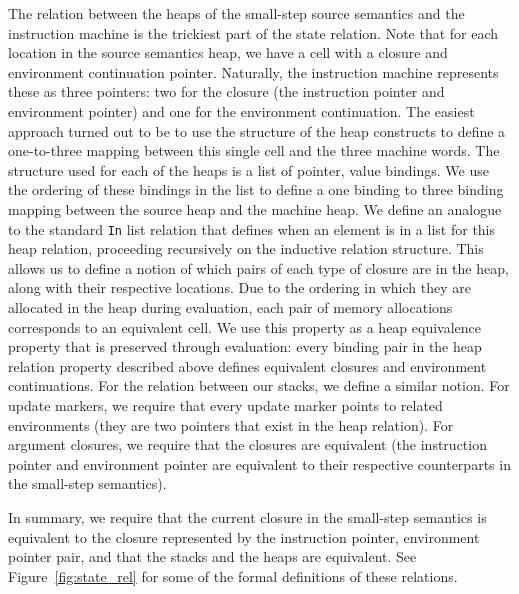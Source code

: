 The relation between the heaps of the small-step source semantics and the
instruction machine is the trickiest part of the state relation. Note that for
each location in the source semantics heap, we have a cell with a closure and
environment continuation pointer. Naturally, the instruction machine represents
these as three pointers: two for the closure (the instruction pointer and
environment pointer) and one for the environment continuation. The easiest
approach turned out to be to use the structure of the heap constructs to define a
one-to-three mapping between this single cell and the three machine words. The
structure used for each of the heaps is a list of pointer, value bindings.
We use the ordering of these bindings in the list to define a one binding to
three binding mapping between the source heap and the machine heap. We define an
analogue to the standard \texttt{In} list relation that defines when an element
is in a list for this heap relation, proceeding recursively on the inductive
relation structure. This allows us to define a notion of which pairs of each
type of closure are in the heap, along with their respective locations. Due to
the ordering in which they are allocated in the heap during evaluation, each pair of
memory allocations corresponds to an equivalent cell. We use this property 
as a heap equivalence property that is preserved through evaluation:
every binding pair in the heap relation property described above defines
equivalent closures and environment continuations. For the relation between our
stacks, we define a similar notion. For update markers, we require that every
update marker points to related environments (they are two pointers that exist
in the heap relation). For argument closures, we require that the closures are
equivalent (the instruction pointer and environment pointer are equivalent to
their respective counterparts in the small-step semantics). 

In summary, we require that the current closure in the small-step semantics is
equivalent to the closure represented by the instruction pointer, environment
pointer pair, and that the stacks and the heaps are equivalent. See
Figure~\ref{fig:state_rel} for some of the formal definitions of these
relations. 

